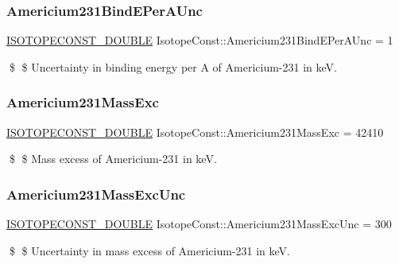 \subsubsection{\texorpdfstring{Americium231\+Bind\+E\+Per\+A\+Unc}{Americium231BindEPerAUnc}}
{\footnotesize\ttfamily \mbox{\hyperlink{group___isotope_const-_macros_ga8f45a7272ce02c0b4c65c44636ed719a}{I\+S\+O\+T\+O\+P\+E\+C\+O\+N\+S\+T\+\_\+\+D\+O\+U\+B\+LE}} Isotope\+Const\+::\+Americium231\+Bind\+E\+Per\+A\+Unc = 1}

\$ \$ Uncertainty in binding energy per A of Americium-\/231 in keV. \mbox{\label{group___isotope_const-_americium-_am231_ga78161990eee1c8cc41ab1358e1c6014d}} 
\subsubsection{\texorpdfstring{Americium231\+Mass\+Exc}{Americium231MassExc}}
{\footnotesize\ttfamily \mbox{\hyperlink{group___isotope_const-_macros_ga8f45a7272ce02c0b4c65c44636ed719a}{I\+S\+O\+T\+O\+P\+E\+C\+O\+N\+S\+T\+\_\+\+D\+O\+U\+B\+LE}} Isotope\+Const\+::\+Americium231\+Mass\+Exc = 42410}

\$ \$ Mass excess of Americium-\/231 in keV. \mbox{\label{group___isotope_const-_americium-_am231_ga93e18490916450c84f618df47ec4698a}} 
\subsubsection{\texorpdfstring{Americium231\+Mass\+Exc\+Unc}{Americium231MassExcUnc}}
{\footnotesize\ttfamily \mbox{\hyperlink{group___isotope_const-_macros_ga8f45a7272ce02c0b4c65c44636ed719a}{I\+S\+O\+T\+O\+P\+E\+C\+O\+N\+S\+T\+\_\+\+D\+O\+U\+B\+LE}} Isotope\+Const\+::\+Americium231\+Mass\+Exc\+Unc = 300}

\$ \$ Uncertainty in mass excess of Americium-\/231 in keV. \mbox{\label{group___isotope_const-_americium-_am231_gab8016912718298fb2973714bb2129887}} 
